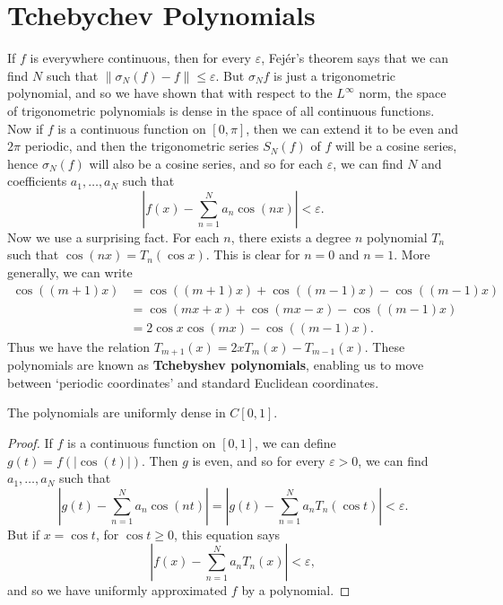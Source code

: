 \section{Tchebychev Polynomials}

If $f$ is everywhere continuous, then for every $\varepsilon$, Fej\'{e}r's theorem says that we can find $N$ such that $\| \sigma_N(f) - f \| \leq \varepsilon$. But $\sigma_N f$ is just a trigonometric polynomial, and so we have shown that with respect to the $L^\infty$ norm, the space of trigonometric polynomials is dense in the space of all continuous functions.  Now if $f$ is a continuous function on $[0,\pi]$, then we can extend it to be even and $2\pi$ periodic, and then the trigonometric series $S_N(f)$ of $f$ will be a cosine series, hence $\sigma_N(f)$ will also be a cosine series, and so for each $\varepsilon$, we can find $N$ and coefficients $a_1, \dots, a_N$ such that
%
\[ \left| f(x) - \sum_{n = 1}^N a_n \cos(nx) \right| < \varepsilon. \]
%
Now we use a surprising fact. For each $n$, there exists a degree $n$ polynomial $T_n$ such that $\cos(nx) = T_n(\cos x)$. This is clear for $n = 0$ and $n = 1$. More generally, we can write
%
\begin{align*}
	\cos((m+1)x) &= \cos((m+1)x) + \cos((m-1)x) - \cos((m-1)x)\\
	&= \cos(mx + x) + \cos(mx - x) - \cos((m-1)x)\\
	&= 2 \cos x \cos(mx) - \cos((m-1)x).
\end{align*}
%
Thus we have the relation  $T_{m+1}(x) = 2xT_m(x) - T_{m-1}(x)$. These polynomials are known as {\bf Tchebyshev polynomials}, enabling us to move between `periodic coordinates' and standard Euclidean coordinates.

\begin{corollary}[Weirstrass]
	The polynomials are uniformly dense in $C[0,1]$.
\end{corollary}
\begin{proof}
	If $f$ is a continuous function on $[0,1]$, we can define $g(t) = f(|\cos(t)|)$. Then $g$ is even, and so for every $\varepsilon > 0$, we can find $a_1, \dots, a_N$ such that
	\[ \left|g(t) - \sum_{n = 1}^N a_n \cos(nt) \right| = \left| g(t) - \sum_{n = 1}^N a_n T_n(\cos t) \right| < \varepsilon. \]
	But if $x = \cos t$, for $\cos t \geq 0$, this equation says
	\[ \left| f(x) - \sum_{n = 1}^N a_n T_n(x) \right| < \varepsilon, \]
	and so we have uniformly approximated $f$ by a polynomial.
\end{proof}

